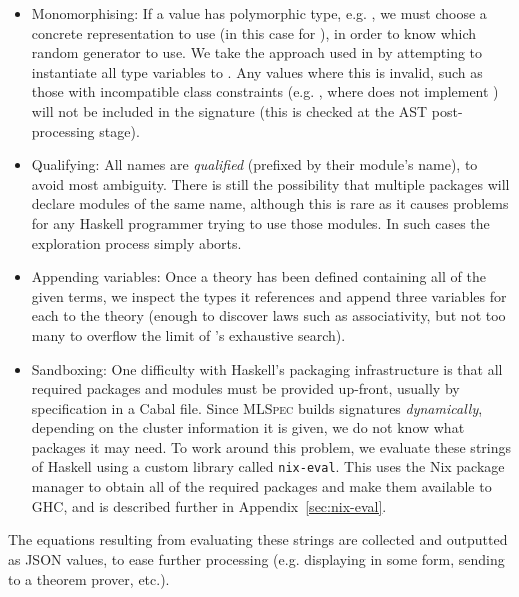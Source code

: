 \begin{itemize}
\item{Monomorphising}: If a value has polymorphic type, e.g. , we must choose a concrete representation to use (in this
  case for ), in order to know which random generator to use. We take the
  approach used in \qcheck{} by attempting to instantiate all type variables to
  . Any values where this is invalid, such as those with
  incompatible class constraints (e.g. , where
   does not implement ) will not be included in the
  signature (this is checked at the AST post-processing stage).

\item{Qualifying}: All names are \emph{qualified} (prefixed by their module's
  name), to avoid most ambiguity. There is still the possibility that multiple
  packages will declare modules of the same name, although this is rare as it
  causes problems for any Haskell programmer trying to use those modules. In
  such cases the exploration process simply aborts.

\item{Appending variables}: Once a \qspec{} theory has been defined containing
  all of the given terms, we inspect the types it references and append three
  variables for each to the theory (enough to discover laws such as
  associativity, but not too many to overflow the limit of \qspec{}'s exhaustive
  search).

\item{Sandboxing}: One difficulty with Haskell's packaging infrastructure is
  that all required packages and modules must be provided up-front, usually by
  specification in a Cabal file. Since \textsc{MLSpec} builds signatures
  \emph{dynamically}, depending on the cluster information it is given, we do
  not know what packages it may need. To work around this problem, we evaluate
  these strings of Haskell using a custom library called \texttt{nix-eval}. This
  uses the Nix package manager to obtain all of the required packages and make
  them available to GHC, and is described further in
  Appendix~\ref{sec:nix-eval}.

\end{itemize}

The equations resulting from evaluating these strings are collected and
outputted as JSON values, to ease further processing (e.g. displaying in some
form, sending to a theorem prover, etc.).

